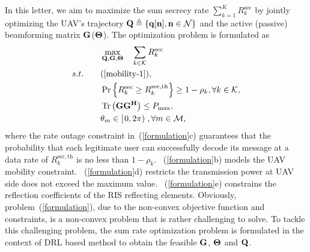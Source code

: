 \documentclass[journal]{IEEEtran}
\begin{document}
In this letter, we aim to maximize the sum secrecy rate $\sum_{k=1}^{K}  R_{k}^{\mathrm{sec}} $ by jointly optimizing the UAV's trajectory $\bf{Q} \triangleq\{\bm{q}[n], n \in \mathcal{N}\}$ and the active (passive) beamforming matrix $\bf{G}$($\bf{\Theta}$). The optimization problem is formulated as 
\begin{subequations}\label{formulation}
  \begin{align}
    &\mathop {\max }\limits_{{\bf{Q}},{\bf{G}},{\bf{\Theta }}} \quad\sum\limits_{k \in {\cal K}} {{R_k^{\mathrm{sec}}}}\\
    s.t.\qquad &(\ref{mobility-1}),\\
    &\operatorname{Pr}\left\{{R_k^{\mathrm{sec}}} \geq R_{k}^{\mathrm{sec,th}}\right\} \geq 1-\rho_{k}, \forall k \in \mathcal{K},\\
    &\operatorname{Tr}\left(\bf{G} \bf{G}^{H}\right) \leq P_{\max },\\
    &{\theta _m} \in \left[ {\left. {0,2\pi } \right)} \right. , \forall m \in {\cal M},
  \end{align}
\end{subequations}
where the rate outage constraint in~(\ref{formulation}\rm{c}) guarantees that the probability that each legitimate user can successfully decode its message at a data rate of $ R_{k}^{\mathrm{sec,th}}$ is no less than $1-\rho_k$. ~(\ref{formulation}\rm{b}) models the UAV mobility constraint. ~(\ref{formulation}\rm{d}) restricts the transmission power at UAV side does not exceed the maximum value. ~(\ref{formulation}\rm{e}) constrains the reflection coefficients of  the RIS reflecting elements. Obviously, problem~(\ref{formulation}), due to the non-convex objective function and constraints, is a non-convex problem that is rather challenging to solve. To tackle this challenging problem, the sum rate optimization problem is formulated in the context of DRL based method to obtain the feasible $\bf{G} $, $\bf{\Theta} $ and $\bf{Q}$.
\end{document}
